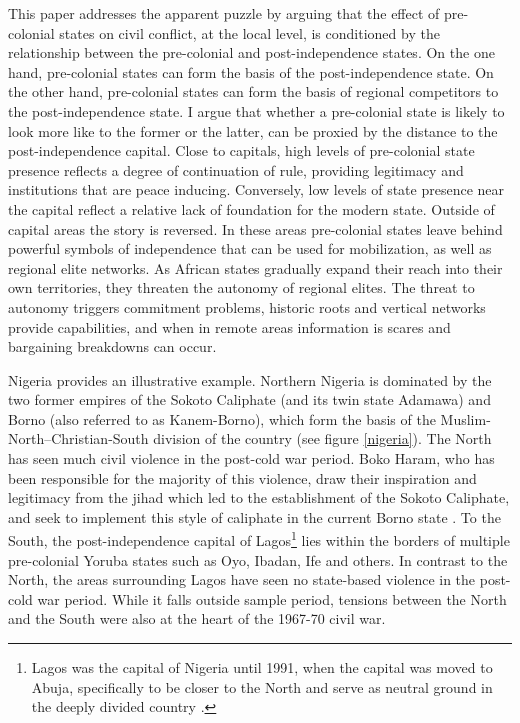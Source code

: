 \documentclass[12pt]{article}
\begin{document}
This paper addresses the apparent puzzle by arguing that the effect of
pre-colonial states on civil conflict, at the local level, is conditioned by the
relationship between the pre-colonial and post-independence states. On the one
hand, pre-colonial states can form the basis of the post-independence state. On
the other hand, pre-colonial states can form the basis of regional competitors
to the post-independence state. I argue that whether a pre-colonial state is
likely to look more like to the former or the latter, can be proxied by the
distance to the post-independence capital. Close to capitals, high levels of
pre-colonial state presence reflects a degree of continuation of rule, providing
legitimacy and institutions that are peace inducing. Conversely, low levels of
state presence near the capital reflect a relative lack of foundation for the
modern state. Outside of capital areas the story is reversed. In these areas
pre-colonial states leave behind powerful symbols of independence that can be
used for mobilization, as well as regional elite networks. As African states
gradually expand their reach into their own territories, they threaten the
autonomy of regional elites. The threat to autonomy triggers commitment
problems, historic roots and vertical networks provide capabilities, and when in
remote areas information is scares and bargaining breakdowns can occur. 

Nigeria provides an illustrative example. Northern Nigeria is dominated by the
two former empires of the Sokoto Caliphate (and its twin state Adamawa) and
Borno (also referred to as Kanem-Borno), which form the basis of the
Muslim-North--Christian-South division of the country (see figure
\ref{nigeria}). The North has seen much civil violence in the post-cold
war period. Boko Haram, who has been responsible for the majority of this
violence, draw their inspiration and legitimacy from the jihad which led to the
establishment of the Sokoto Caliphate, and seek to implement this style of
caliphate in the current Borno state \citep{Pieri2016}. To the South, the
post-independence capital of Lagos\footnote{Lagos was the capital of Nigeria
until 1991, when the capital was moved to Abuja, specifically to be closer to
the North and serve as neutral ground in the deeply divided country
\citep{Moore_1984}.} lies within the borders of multiple pre-colonial Yoruba
states such as Oyo, Ibadan, Ife and others. In contrast to the North, the areas
surrounding Lagos have seen no state-based violence in the post-cold war period.
While it falls outside sample period, tensions between the North and the South
were also at the heart of the 1967-70 civil war.
\end{document}
